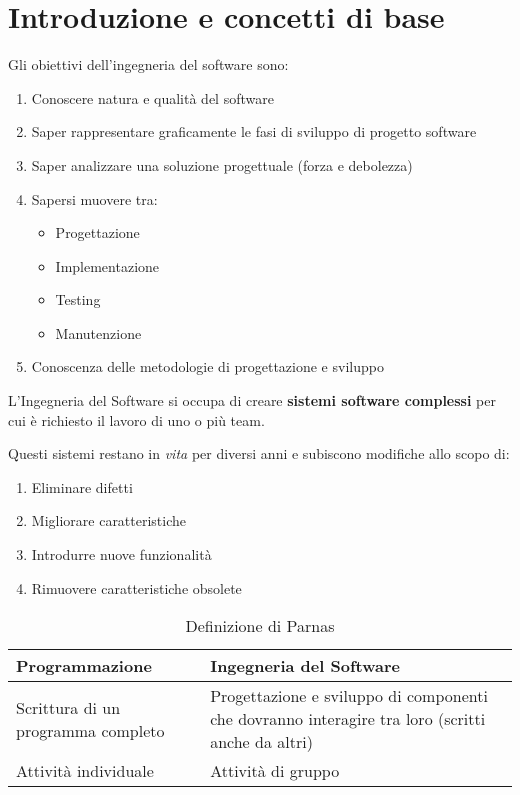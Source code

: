 \chapter{Introduzione e concetti di base}

Gli obiettivi dell'ingegneria del software sono:
\begin{enumerate}
    \item Conoscere natura e qualità del software
    \item Saper rappresentare graficamente le fasi di sviluppo di progetto software
    \item Saper analizzare una soluzione progettuale (forza e debolezza)
    \item Sapersi muovere tra:
    \begin{itemize}
        \item Progettazione
        \item Implementazione
        \item Testing
        \item Manutenzione
    \end{itemize}
    \item Conoscenza delle metodologie di progettazione e sviluppo
\end{enumerate}

L'Ingegneria del Software si occupa di creare \textbf{sistemi software complessi} per cui è richiesto il lavoro di uno o più team.

Questi sistemi restano in \textit{vita} per diversi anni e subiscono modifiche allo scopo di:
\begin{enumerate}
    \item Eliminare difetti
    \item Migliorare caratteristiche
    \item Introdurre nuove funzionalità
    \item Rimuovere caratteristiche obsolete
\end{enumerate}

\begin{table}[H]
    \centering
    \begin{tabularx}{\textwidth}{|X|X|}
        \hline
        \textbf{Programmazione} & \textbf{Ingegneria del Software} \\
        \hline
        Scrittura di un programma completo & Progettazione e sviluppo di componenti che dovranno interagire tra loro (scritti anche da altri) \\
        \hline
        Attività individuale & Attività di gruppo \\
        \hline
    \end{tabularx}
    \caption{Definizione di Parnas}
\end{table}

